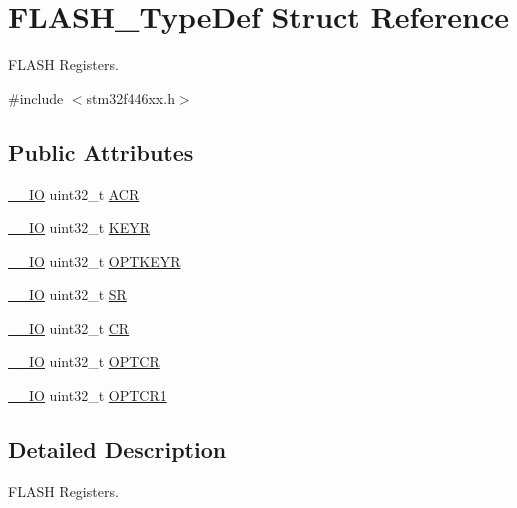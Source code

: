 \hypertarget{struct_f_l_a_s_h___type_def}{}\section{F\+L\+A\+S\+H\+\_\+\+Type\+Def Struct Reference}
\label{struct_f_l_a_s_h___type_def}


F\+L\+A\+SH Registers.  




{\ttfamily \#include $<$stm32f446xx.\+h$>$}

\subsection*{Public Attributes}
\begin{DoxyCompactItemize}
\item 
\hyperlink{core__sc300_8h_aec43007d9998a0a0e01faede4133d6be}{\+\_\+\+\_\+\+IO} uint32\+\_\+t \hyperlink{struct_f_l_a_s_h___type_def_aaf432a8a8948613f4f66fcace5d2e5fe}{A\+CR}
\item 
\hyperlink{core__sc300_8h_aec43007d9998a0a0e01faede4133d6be}{\+\_\+\+\_\+\+IO} uint32\+\_\+t \hyperlink{struct_f_l_a_s_h___type_def_a802e9a26a89b44decd2d32d97f729dd3}{K\+E\+YR}
\item 
\hyperlink{core__sc300_8h_aec43007d9998a0a0e01faede4133d6be}{\+\_\+\+\_\+\+IO} uint32\+\_\+t \hyperlink{struct_f_l_a_s_h___type_def_a793cd13a4636c9785fdb99316f7fd7ab}{O\+P\+T\+K\+E\+YR}
\item 
\hyperlink{core__sc300_8h_aec43007d9998a0a0e01faede4133d6be}{\+\_\+\+\_\+\+IO} uint32\+\_\+t \hyperlink{struct_f_l_a_s_h___type_def_a52c4943c64904227a559bf6f14ce4de6}{SR}
\item 
\hyperlink{core__sc300_8h_aec43007d9998a0a0e01faede4133d6be}{\+\_\+\+\_\+\+IO} uint32\+\_\+t \hyperlink{struct_f_l_a_s_h___type_def_a7919306d0e032a855200420a57f884d7}{CR}
\item 
\hyperlink{core__sc300_8h_aec43007d9998a0a0e01faede4133d6be}{\+\_\+\+\_\+\+IO} uint32\+\_\+t \hyperlink{struct_f_l_a_s_h___type_def_a54026c3b5bc2059f1b187acb6c4817ac}{O\+P\+T\+CR}
\item 
\hyperlink{core__sc300_8h_aec43007d9998a0a0e01faede4133d6be}{\+\_\+\+\_\+\+IO} uint32\+\_\+t \hyperlink{struct_f_l_a_s_h___type_def_a180354afdf5ff27d04befd794c46156d}{O\+P\+T\+C\+R1}
\end{DoxyCompactItemize}


\subsection{Detailed Description}
F\+L\+A\+SH Registers. 

